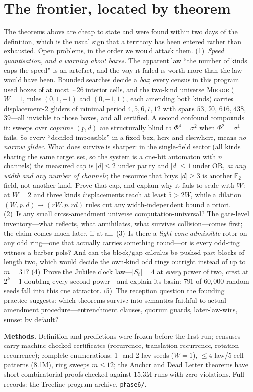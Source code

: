 \documentclass[10pt]{article}
\theoremstyle{definition}
\theoremstyle{remark}
\begin{document}
\section{The frontier, located by theorem}
The theorems above are cheap to state and were found within two days of the
definition, which is the usual sign that a territory has been entered rather
than exhausted. Open problems, in the order we would attack them.
(1)~\emph{Speed quantisation, and a warning about boxes.} The apparent law
``the number of kinds caps the speed'' is an artefact, and the way it failed is
worth more than the law would have been. Bounded searches decide a \emph{box};
every census in this program used boxes of at most $\sim$26 interior cells, and
the two-kind universe \textsc{Mirror} ($W=1$, rules $(0,1,-1)$ and $(0,-1,1)$,
each amending both kinds) carries displacement-2 gliders of minimal period
$4,5,6,7,12$ with spans $53$, $20$, $616$, $438$, $39$---all invisible to those
boxes, and all certified. A second confound compounds it: sweeps over
\emph{coprime} $(p,d)$ are structurally blind to $\Phi^4=\sigma^2$ when
$\Phi^2=\sigma^1$ fails. So every ``decided impossible'' in a fixed box, here
and elsewhere, means \emph{no narrow glider}. What does survive is sharper: in
the single-field sector (all kinds sharing the same target set, so the system
is a one-bit automaton with $n$ channels) the measured cap is $|d|\le2$ under
parity and $|d|\le1$ under OR, \emph{at any width and any number of channels};
the resource that buys $|d|\ge3$ is another $\mathbb{F}_2$ field, not another
kind. Prove that cap, and explain why it fails to scale with $W$: at $W=2$ and
three kinds displacements reach at least $5>2W$, while a dilation
$(W,p,d)\mapsto(rW,p,rd)$ rules out any width-independent bound a priori.
(2)~Is any small cross-amendment universe computation-universal? The gate-level
inventory---what reflects, what annihilates, what survives collision---comes
first; the claim comes much later, if at all.
(3)~Is there a \emph{light-cone-admissible} rotor on any odd ring---one that
actually carries something round---or is every odd-ring witness a barber pole?
And can the block/gap calculus be pushed past blocks of length two, which would
decide the own-kind odd rings outright instead of up to $m=31$?
(4)~Prove the Jubilee clock law---$|S_t|=4$ at \emph{every} power of two,
crest at $2^k-1$ doubling every second power---and explain its basin: $791$ of
$60{,}000$ random seeds fall into this one attractor.
(5)~The reception question the founding practice suggests: which theorems
survive into semantics faithful to actual amendment procedure---entrenchment
clauses, quorum guards, later-law-wins, sunset by default?

\vspace{4pt}
\noindent\textbf{Methods.} Definition and predictions were frozen before the
first run; censuses carry machine-checked certificates (recurrence,
translation-recurrence, rotation-recurrence); complete enumerations: 1- and
2-law seeds ($W{=}1$), $\le$4-law/5-cell patterns (8.1M), ring sweeps
$m\le12$; the Anchor and Dead Letter theorems have short combinatorial proofs
checked against 15.3M runs with zero violations. Full records: the Treeline
program archive, \texttt{phase6/}.
\end{document}
